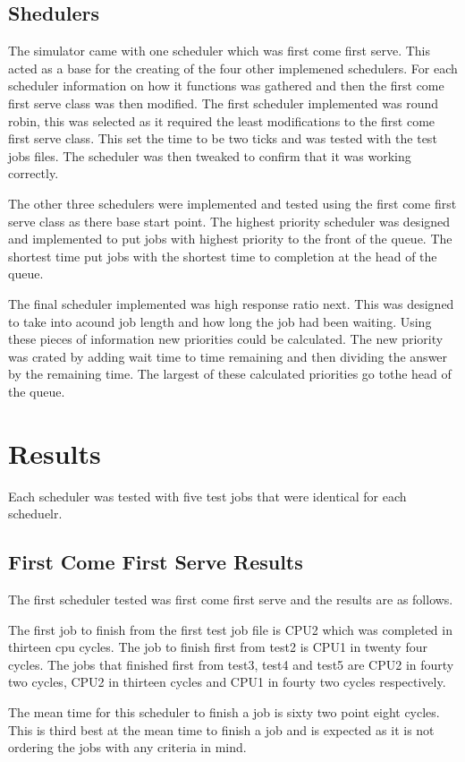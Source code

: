 \documentclass{acm_proc_article-sp}
\begin{document}
\subsection{Shedulers}
The simulator came with one scheduler which was first come first serve. This acted as a base for the creating of the four other implemened schedulers. For each scheduler information on how it functions was gathered and then the first come first serve class was then modified. The first scheduler implemented was round robin, this was selected as it required the least modifications to the first come first serve class. This set the time to be two ticks and was tested with the test jobs files. The scheduler was then tweaked to confirm that it was working correctly.

The other three schedulers were implemented and tested using the first come first serve class as there base start point. The highest priority scheduler was designed and implemented to put jobs with highest priority to the front of the queue. The shortest time put jobs with the shortest time to completion at the head of the queue.

The final scheduler implemented was high response ratio next. This was designed to take into acound job length and how long the job had been waiting. Using these pieces of information new priorities could be calculated. The new priority was crated by adding wait time to time remaining and then dividing the answer by the remaining time. The largest of these calculated priorities go tothe head of the queue. 

\section{Results}
Each scheduler was tested with five test jobs that were identical for each scheduelr.
\subsection{First Come First Serve Results}
The first scheduler tested was first come first serve and the results are as follows.

The first job to finish from the first test job file is CPU2 which was completed in thirteen cpu cycles. The job to finish first from test2 is CPU1 in twenty four cycles. The jobs that finished first from test3, test4 and test5 are CPU2 in fourty two cycles, CPU2 in thirteen cycles and CPU1 in fourty two cycles respectively. 

The mean time for this scheduler to finish a job is sixty two point eight cycles. This is third best at the mean time to finish a job and is expected as it is not ordering the jobs with any criteria in mind.
\end{document}
